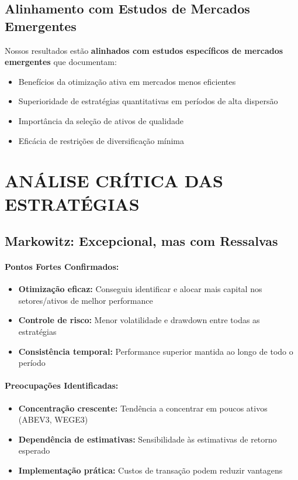 \subsection{Alinhamento com Estudos de Mercados Emergentes}

Nossos resultados estão \textbf{alinhados com estudos específicos de mercados emergentes} que documentam:

\begin{itemize}
    \item Benefícios da otimização ativa em mercados menos eficientes
    \item Superioridade de estratégias quantitativas em períodos de alta dispersão
    \item Importância da seleção de ativos de qualidade
    \item Eficácia de restrições de diversificação mínima
\end{itemize}

\section{ANÁLISE CRÍTICA DAS ESTRATÉGIAS}

\subsection{Markowitz: Excepcional, mas com Ressalvas}

\paragraph{Pontos Fortes Confirmados:}
\begin{itemize}
    \item \textbf{Otimização eficaz:} Conseguiu identificar e alocar mais capital nos setores/ativos de melhor performance
    \item \textbf{Controle de risco:} Menor volatilidade e drawdown entre todas as estratégias
    \item \textbf{Consistência temporal:} Performance superior mantida ao longo de todo o período
\end{itemize}

\paragraph{Preocupações Identificadas:}
\begin{itemize}
    \item \textbf{Concentração crescente:} Tendência a concentrar em poucos ativos (ABEV3, WEGE3)
    \item \textbf{Dependência de estimativas:} Sensibilidade às estimativas de retorno esperado
    \item \textbf{Implementação prática:} Custos de transação podem reduzir vantagens
\end{itemize}

